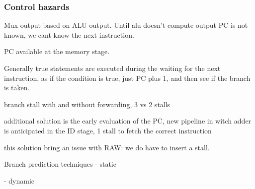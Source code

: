 \subsubsection{Control hazards}
Mux output based on ALU output.
Until alu doesn't compute output PC is not known, we cant know the next instruction.

PC available at the memory stage.

Generally true statements are executed during the waiting for the next instruction, as if  the condition is true, just PC plus 1, and then see if the branch is taken.

branch stall with and without forwarding, 3 vs 2 stalls

additional solution is the early evaluation of the PC, new pipeline in witch adder is anticipated in the ID stage, 1 stall to fetch the correct
instruction

this solution bring an issue with RAW: we do have to insert a stall.

Branch prediction techniques
- static

- dynamic


\subsubsection{}



